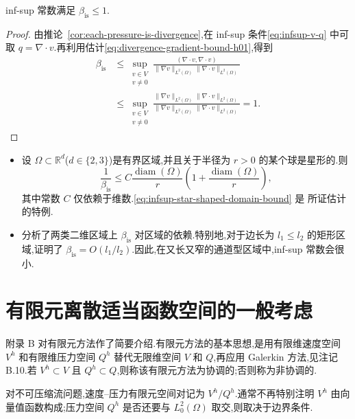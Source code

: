 \begin{lemma}\label{lem:infsup-constant-upper-bound}
inf-sup 常数满足 $\beta_{\mathrm{is}}\le1$.
\end{lemma}
\begin{proof}
由推论~\ref{cor:each-pressure-is-divergence},在 inf-sup 条件\cref{eq:infsup-v-q} 中可取 $q=\nabla\cdot v$.再利用估计\cref{eq:divergence-gradient-bound-h01},得到
\[
\begin{aligned}
  \beta_{\mathrm{is}}
   &\le\sup_{\substack{v\in V\\v\ne0}}
      \frac{(\nabla\cdot v,\nabla\cdot v)}
           {\|\nabla v\|_{L^2(\Omega)}\|\nabla\cdot v\|_{L^2(\Omega)}}\\
   &\le\sup_{\substack{v\in V\\v\ne0}}
      \frac{\|\nabla v\|_{L^2(\Omega)}\|\nabla\cdot v\|_{L^2(\Omega)}}
           {\|\nabla v\|_{L^2(\Omega)}\|\nabla\cdot v\|_{L^2(\Omega)}}=1.
\end{aligned}
\]
\end{proof}

\begin{note}\label{note:infsup-domain-dependence}
\begin{itemize}
  \item 设 $\Omega\subset\mathbb{R}^d$($d\in\{2,3\}$)是有界区域,并且关于半径为 $r>0$ 的某个球是星形的.则
  \begin{equation}\label{eq:infsup-star-shaped-domain-bound}
    \frac1{\beta_{\mathrm{is}}}
      \le C\frac{\operatorname{diam}(\Omega)}{r}
         \left(1+\frac{\operatorname{diam}(\Omega)}{r}\right),
  \end{equation}
  其中常数 $C$ 仅依赖于维数.\cref{eq:infsup-star-shaped-domain-bound} 是\textcite[定理 III.3.1]{Galdi2011} 所证估计的特例.
  \item \textcite{ChizhonkovOlshanskii2000} 分析了两类二维区域上 $\beta_{\mathrm{is}}$ 对区域的依赖.特别地,对于边长为 $l_1\le l_2$ 的矩形区域,证明了 $\beta_{\mathrm{is}}=O(l_1/l_2)$.因此,在又长又窄的通道型区域中,inf-sup 常数会很小.
\end{itemize}
\end{note}

\section{有限元离散适当函数空间的一般考虑}\label{sec:finite-element-spaces-general}

\begin{note}[有限元方法]\label{note:finite-element-methods}
附录 B 对有限元方法作了简要介绍.有限元方法的基本思想,是用有限维速度空间 $V^h$ 和有限维压力空间 $Q^h$ 替代无限维空间 $V$ 和 $Q$,再应用 Galerkin 方法,见注记 B.10.若 $V^h\subset V$ 且 $Q^h\subset Q$,则称该有限元方法为协调的;否则称为非协调的.

对不可压缩流问题,速度--压力有限元空间对记为 $V^h/Q^h$.通常不再特别注明 $V^h$ 由向量值函数构成;压力空间 $Q^h$ 是否还要与 $L_0^2(\Omega)$ 取交,则取决于边界条件.
\end{note}

